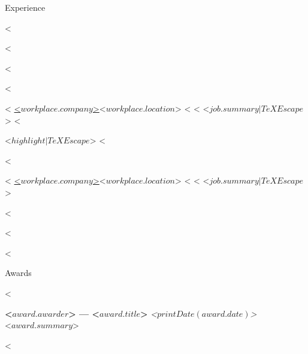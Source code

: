 \documentclass{resume} %
\begin{document}
\begin{rSection}{Experience}

<%

<%

<%

<%
\begin{rSubsection}
<%
{\href{<$ workplace.website $>}{<$ workplace.company $>}}{<$ workplace.location $>}
<%
{}{}
<%
{ <$ job.summary | TeXEscape $> }
<%
\item <$ highlight | TeXEscape $>
<%
\end{rSubsection}

<%

\begin{rSubsectionNoList}<%
{\href{<$ workplace.website $>}{<$ workplace.company $>}}{<$ workplace.location $>}
<%
{}{}
<%
{ <$ job.summary | TeXEscape $> }
\end{rSubsectionNoList}

<%

<%

<%

\end{rSection}


\begin{rSection}{Awards}

<%

{\bf <$ award.awarder $> --- <$ award.title $>} \hfill {\em <$ printDate(award.date) $>} \\ 
<$ award.summary $>

<%


\end{rSection}

\end{document}
